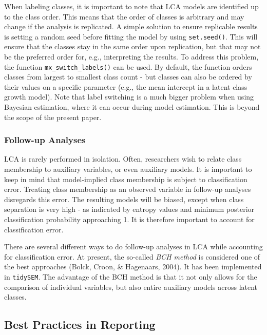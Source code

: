 \documentclass[
  ,man,floatsintext]{apa6}
\begin{document}
When labeling classes, it is important to note that LCA models are identified up to the class order.
This means that the order of classes is arbitrary and may change if the analysis is replicated.
A simple solution to ensure replicable results is setting a random seed before fitting the model by using \texttt{set.seed()}.
This will ensure that the classes stay in the same order upon replication,
but that may not be the preferred order for, e.g., interpreting the results.
To address this problem, the function \texttt{mx\_switch\_labels()} can be used.
By default, the function orders classes from largest to smallest class count - but classes can also be ordered by their values on a specific parameter (e.g., the mean intercept in a latent class growth model).
Note that label switching is a much bigger problem when using Bayesian estimation,
where it can occur during model estimation.
This is beyond the scope of the present paper.

\hypertarget{follow-up-analyses}{%
\subsubsection{Follow-up Analyses}\label{follow-up-analyses}}

LCA is rarely performed in isolation.
Often, researchers wish to relate class membership to auxiliary variables, or even auxiliary models.
It is important to keep in mind that model-implied class membership is subject to classification error.
Treating class membership as an observed variable in follow-up analyses disregards this error.
The resulting models will be biased, except when class separation is very high
- as indicated by entropy values and minimum posterior classification probability approaching 1.
It is therefore important to account for classification error.

There are several different ways to do follow-up analyses in LCA while accounting for classification error.
At present, the so-called \emph{BCH method} is considered one of the best approaches (Bolck, Croon, \& Hagenaars, 2004).
It has been implemented in \texttt{tidySEM}. The advantage of the BCH method is that it not only allows for the comparison of individual variables,
but also entire auxiliary models across latent classes.

\hypertarget{best-practices-in-reporting}{%
\subsection{Best Practices in Reporting}\label{best-practices-in-reporting}}
\end{document}
